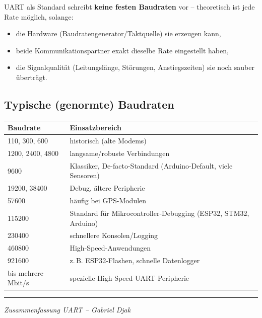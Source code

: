 \documentclass[a4paper,11pt]{article}
\begin{document}
UART als Standard schreibt \textbf{keine festen Baudraten} vor -- theoretisch ist jede Rate möglich, solange:

\begin{itemize}[leftmargin=1.5em]
    \item die Hardware (Baudratengenerator/Taktquelle) sie erzeugen kann,
    \item beide Kommunikationspartner exakt dieselbe Rate eingestellt haben,
    \item die Signalqualität (Leitungslänge, Störungen, Anstiegszeiten) sie noch sauber überträgt.
\end{itemize}

\subsection*{Typische (genormte) Baudraten}

\begin{center}
\begin{tabularx}{\textwidth}{@{}l X@{}}
\toprule
\textbf{Baudrate} & \textbf{Einsatzbereich} \\
\midrule
110, 300, 600 & historisch (alte Modems) \\
1200, 2400, 4800 & langsame/robuste Verbindungen \\
9600 & Klassiker, De-facto-Standard (Arduino-Default, viele Sensoren) \\
19200, 38400 & Debug, ältere Peripherie \\
57600 & häufig bei GPS-Modulen \\
115200 & Standard für Mikrocontroller-Debugging (ESP32, STM32, Arduino) \\
230400 & schnellere Konsolen/Logging \\
460800 & High-Speed-Anwendungen \\
921600 & z.\,B. ESP32-Flashen, schnelle Datenlogger \\
bis mehrere Mbit/s & spezielle High-Speed-UART-Peripherie \\
\bottomrule
\end{tabularx}
\end{center}

\bigskip
\noindent\rule{\textwidth}{0.4pt}

\noindent\textit{Zusammenfassung UART -- Gabriel Djak}
\end{document}
